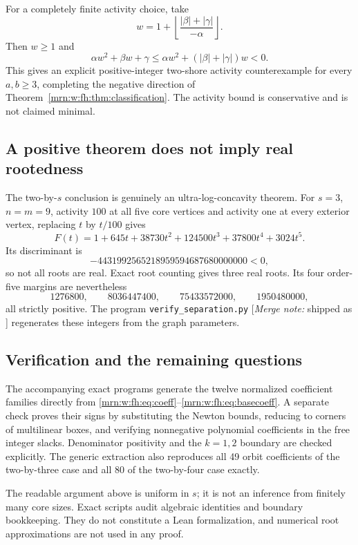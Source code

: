 \documentclass[11pt,a4paper]{article}
\theoremstyle{remark}\newtheorem{remark}[theorem]{Remark}
\newcommand{\mnote}[1]{[\textit{Merge note:} #1]}
\begin{document}
For a completely finite activity choice, take
\[
 w=1+\left\lfloor\frac{|\beta|+|\gamma|}{-\alpha}\right\rfloor.
\]
Then $w\ge1$ and
\[
 \alpha w^2+\beta w+\gamma
 \le\alpha w^2+(|\beta|+|\gamma|)w<0.
\]
This gives an explicit positive-integer two-shore activity counterexample for every $a,b\ge3$, completing the negative direction of Theorem~\ref{mrn:w:fh:thm:classification}. The activity bound is conservative and is not claimed minimal.

\subsection{A positive theorem does not imply real rootedness}
The two-by-$s$ conclusion is genuinely an ultra-log-concavity theorem. For $s=3$, $n=m=9$, activity $100$ at all five core vertices and activity one at every exterior vertex, replacing $t$ by $t/100$ gives
\[
 F(t)=1+645t+38730t^2+124500t^3+37800t^4+3024t^5.
\]
Its discriminant is
\[
 -4431992565218959594687680000000<0,
\]
so not all roots are real. Exact root counting gives three real roots. Its four order-five margins are nevertheless
\[
 1276800,\qquad8036447400,\qquad75433572000,\qquad1950480000,
\]
all strictly positive. The program \texttt{verify\_separation.py} \mnote{shipped as } regenerates these integers from the graph parameters.

\subsection{Verification and the remaining questions}
The accompanying exact programs generate the twelve normalized coefficient families directly from \eqref{mrn:w:fh:eq:coeff}--\eqref{mrn:w:fh:eq:basecoeff}. A separate check proves their signs by substituting the Newton bounds, reducing to corners of multilinear boxes, and verifying nonnegative polynomial coefficients in the free integer slacks. Denominator positivity and the $k=1,2$ boundary are checked explicitly. The generic extraction also reproduces all 49 orbit coefficients of the two-by-three case and all 80 of the two-by-four case exactly.

The readable argument above is uniform in $s$; it is not an inference from finitely many core sizes. Exact scripts audit algebraic identities and boundary bookkeeping. They do not constitute a Lean formalization, and numerical root approximations are not used in any proof.
\end{document}
